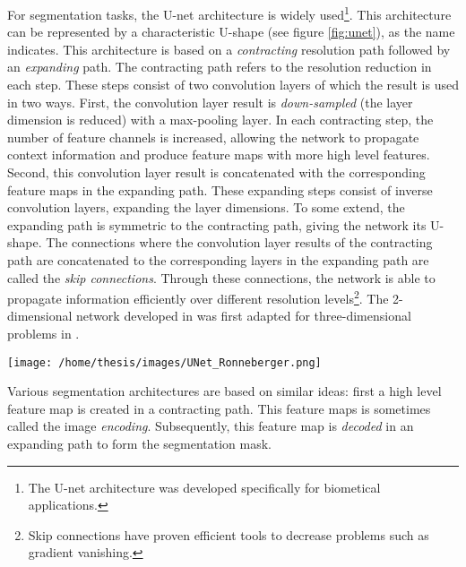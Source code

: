 \par{
    For segmentation tasks, the U-net architecture\cite{Ronneberger2015} is widely used\footnote{The U-net architecture was developed specifically for biometical applications.}. 
    This architecture can be represented by a characteristic U-shape (see figure \ref{fig:unet}), as the name indicates.
    This architecture is based on a \textit{contracting} resolution path followed by an \textit{expanding} path. 
    The contracting path refers to the resolution reduction in each step. 
    These steps consist of two convolution layers of which the result is used in two ways. 
    First, the convolution layer result is \textit{down-sampled} (the layer dimension is reduced) with a max-pooling layer.
    In each contracting step, the number of feature channels is increased, allowing the network to propagate context information and produce feature maps with more high level features.
    Second, this convolution layer result is concatenated with the corresponding feature maps in the expanding path.
    These expanding steps consist of inverse convolution layers, expanding the layer dimensions. To some extend, the expanding path is symmetric  to the contracting path, giving the network its U-shape. 
    The connections where the convolution layer results of the contracting path are concatenated to the corresponding layers in the expanding path are called the \textit{skip connections}.
    Through these connections, the network is able to propagate information efficiently over different resolution levels\footnote{Skip connections have proven efficient tools to decrease problems such as gradient vanishing.}.
    The 2-dimensional network developed in \cite{Ronneberger2015} was first adapted for three-dimensional problems in \cite{Cicek2016}.
}
\begin{SCfigure}[][htb]
    \texttt{[image: /home/thesis/images/UNet\_Ronneberger.png]}
    \caption{U-Net architecture, as illustrated in \cite{Ronneberger2015}. 
    Each blue box represents a multi-channel feature-map. 
    The number of channels is indicated above the box, the $x \times y$ dimensions are indicated at the bottom left.
    The gray arrows indicate the feature maps in the contracting path are copied and concatenated to the feature maps of the expanding path.}
    \label{fig:unet}
\end{SCfigure}
\par{
    Various segmentation architectures are based on similar ideas: first a high level feature map is created in a contracting path. 
    This feature maps is sometimes called the image \textit{encoding}. 
    Subsequently, this feature map is \textit{decoded} in an expanding path to form the segmentation mask. 
}


